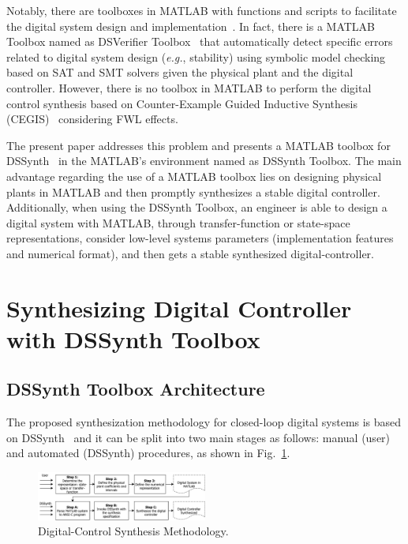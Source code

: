 \documentclass[sigconf]{acmart}
\newcommand\tool{{DSSynth Toolbox}\xspace}
\begin{document}
Notably, there are toolboxes in MATLAB with functions and scripts to facilitate the digital system design and implementation~\cite{matlab-toolbox}. In fact, there is a MATLAB Toolbox named as DSVerifier Toolbox~\cite{issta2017} that automatically detect specific errors related to digital system design ({\it e.g.}, stability) using symbolic model checking based on SAT and SMT solvers given the physical plant and the digital controller. However, there is no toolbox in MATLAB to perform the digital control synthesis based on Counter-Example Guided Inductive Synthesis (CEGIS)~\cite{DBLP:conf/asplos/Solar-LezamaTBSS06} considering FWL effects.

The present paper addresses this problem and presents a MATLAB toolbox for DSSynth~\cite{abate2017, abatecav2017} in the MATLAB's environment named as \tool. The main advantage regarding the use of a MATLAB toolbox lies on designing physical plants in MATLAB and then promptly synthesizes a stable digital controller. Additionally, when using the \tool, an engineer is able to design a digital system with MATLAB, through transfer-function or state-space representations, consider low-level systems parameters (implementation features and numerical format), and then gets a stable synthesized digital-controller.

\section{Synthesizing Digital Controller with \tool}

\subsection{\tool Architecture}

The proposed synthesization methodology for closed-loop digital systems is based on DSSynth~\cite{abate2017, abatecav2017} and it can be split into two main stages as follows: manual (user) and automated (DSSynth) procedures, as shown in Fig.~\ref{fig:synthesis-flow}. 

\begin{figure}[ht!]
\centering
\includegraphics[width=0.5\textwidth]{synthesis-flow.pdf}
\caption{Digital-Control Synthesis Methodology.}
\label{fig:synthesis-flow}
\end{figure}
\end{document}

